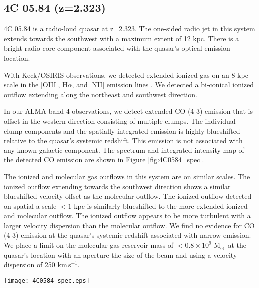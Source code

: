 \documentclass[twocolumn]{aastex63}
\newcommand{\msun}{M$_{\odot}$}
\newcommand{\ha}{H$\alpha$\xspace}
\newcommand{\nii}{[N{\sc II}]\xspace}
\newcommand{\oiii}{[O{\sc III}]\xspace}
\newcommand{\kms}{km\,s$^{-1}$}
\begin{document}
\subsection{4C 05.84 (z=2.323)}\label{sec:4c0584}

4C 05.84 is a radio-loud quasar at z=2.323. The one-sided radio jet in this system extends towards the southwest with a maximum extent of 12 kpc. There is a bright radio core component associated with the quasar's optical emission location.

With Keck/OSIRIS observations, we detected extended ionized gas on an 8 kpc scale in the \oiii, \ha, and \nii emission lines \citep{Vayner19a}. We detected a bi-conical ionized outflow extending along the northeast and southwest direction.

In our ALMA band 4 observations, we detect extended CO (4-3) emission that is offset in the western direction consisting of multiple clumps. The individual clump components and the spatially integrated emission is highly blueshifted relative to the quasar's systemic redshift. This emission is not associated with any known galactic component. The spectrum and integrated intensity map of the detected CO emission are shown in Figure \ref{fig:4C0584_spec}. 

The ionized and molecular gas outflows in this system are on similar scales. The ionized outflow extending towards the southwest direction shows a similar blueshifted velocity offset as the molecular outflow. The ionized outflow detected on spatial a scale $<1$ kpc is similarly blueshifted to the more extended ionized and molecular outflow. The ionized outflow appears to be more turbulent with a larger velocity dispersion than the molecular outflow. We find no evidence for CO (4-3) emission at the quasar's systemic redshift associated with narrow emission. We place a limit on the molecular gas reservoir mass of $<0.8\times10^{9}$ \msun\ at the quasar's location with an aperture the size of the beam and using a velocity dispersion of 250 \kms.


\begin{figure*}[!th]
    \centering
    \texttt{[image: 4C0584\_spec.eps]}
    \caption{ALMA band 4 observations of 4C 05.84. On the left we show optimally extracted intensity map of the molecular outflow in the 4C 05.84 system, detected in the CO (4-3) line. The white contours outline the molecular outflow region. On the right we show a spectrum integrated over the entire molecular outflow region, along with fit to the CO (4-3) emission line. The systemic redshift of the quasar host galaxy is at 0 \kms. The ellipse in the lower left corner on the right panel shows the beam of our ALMA band 4 observations. We detect no molecular CO (4-3) emission at the systemic redshift.}
    \label{fig:4C0584_spec}
\end{figure*}
\end{document}
